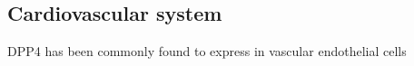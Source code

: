 \subsection{Cardiovascular system}
DPP4 has been commonly found to express in vascular endothelial cells